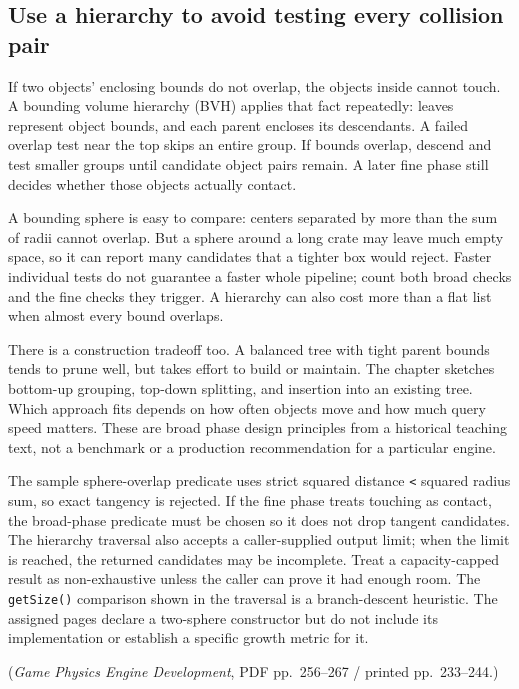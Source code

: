 \subsection{Use a hierarchy to avoid testing every collision pair}\label{06-engine-ii-ch033-use-a-hierarchy-to-avoid-testing-every-collision-pair}

If two objects' enclosing bounds do not overlap, the objects inside cannot touch. A bounding volume hierarchy (BVH) applies that fact repeatedly: leaves represent object bounds, and each parent encloses its descendants. A failed overlap test near the top skips an entire group. If bounds overlap, descend and test smaller groups until candidate object pairs remain. A later fine phase still decides whether those objects actually contact.

A bounding sphere is easy to compare: centers separated by more than the sum of radii cannot overlap. But a sphere around a long crate may leave much empty space, so it can report many candidates that a tighter box would reject. Faster individual tests do not guarantee a faster whole pipeline; count both broad checks and the fine checks they trigger. A hierarchy can also cost more than a flat list when almost every bound overlaps.

There is a construction tradeoff too. A balanced tree with tight parent bounds tends to prune well, but takes effort to build or maintain. The chapter sketches bottom-up grouping, top-down splitting, and insertion into an existing tree. Which approach fits depends on how often objects move and how much query speed matters. These are broad phase design principles from a historical teaching text, not a benchmark or a production recommendation for a particular engine.

The sample sphere-overlap predicate uses strict squared distance \texttt{\textless{}} squared radius sum, so exact tangency is rejected. If the fine phase treats touching as contact, the broad-phase predicate must be chosen so it does not drop tangent candidates. The hierarchy traversal also accepts a caller-supplied output limit; when the limit is reached, the returned candidates may be incomplete. Treat a capacity-capped result as non-exhaustive unless the caller can prove it had enough room. The \texttt{getSize()} comparison shown in the traversal is a branch-descent heuristic. The assigned pages declare a two-sphere constructor but do not include its implementation or establish a specific growth metric for it.

(\emph{Game Physics Engine Development}, PDF pp.~256--267 / printed pp.~233--244.)

